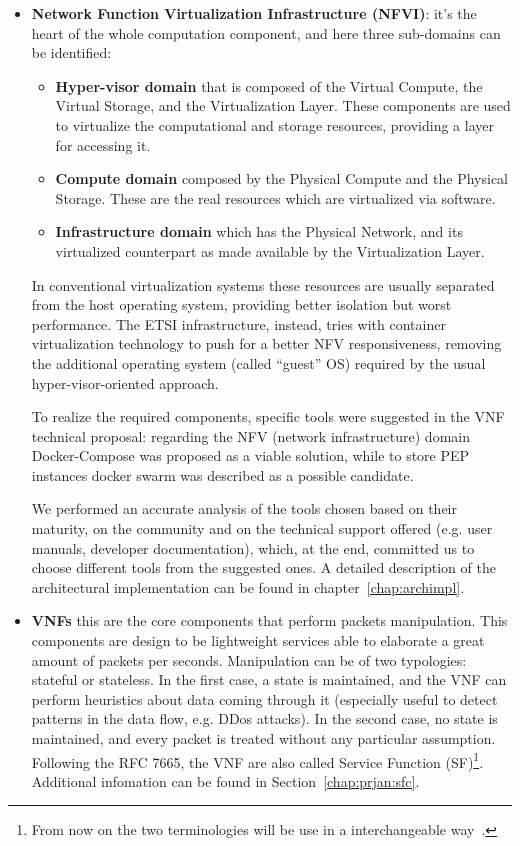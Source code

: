 \begin{itemize}
 \item \textbf{Network Function Virtualization Infrastructure (NFVI)}: it's the
   heart of the whole computation component, and here three sub-domains can be
   identified: 
\begin{itemize} 
 \item \textbf{Hyper-visor domain} that is composed of the Virtual Compute, the
   Virtual Storage, and the Virtualization Layer. These components are used to
   virtualize the computational and storage resources, providing a layer for
   accessing it.
 \item \textbf{Compute domain} composed by the Physical Compute and the Physical
   Storage. These are the real resources which are virtualized via software.
 \item \textbf{Infrastructure domain} which has the Physical Network, and its
   virtualized counterpart as made available by the Virtualization Layer.
\end{itemize}

In conventional virtualization systems these resources are usually separated
from the host operating system, providing better isolation but worst
performance. The ETSI infrastructure, instead, tries with container
virtualization technology to push for a better NFV responsiveness, removing the
additional operating system (called ``guest'' OS) required by the usual
hyper-visor-oriented approach.

To realize the required components, specific tools were suggested in the VNF
technical proposal: regarding the NFV (network infrastructure) domain
Docker-Compose was proposed as a viable solution, while to store PEP instances
docker swarm was described as a possible candidate.

We performed an accurate analysis of the tools chosen based on their maturity,
on the community and on the technical support offered (e.g. user manuals,
developer documentation), which, at the end, committed us to choose different
tools from the suggested ones. A detailed description of the architectural
implementation can be found in chapter~\ref{chap:archimpl}.

\item \textbf{VNFs} this are the core components that perform packets
  manipulation. This components are design to be lightweight services able to
  elaborate a great amount of packets per seconds. Manipulation can be of two
  typologies: stateful or stateless. In the first case, a state is maintained,
  and the VNF can perform heuristics about data coming through it (especially
  useful to detect patterns in the data flow, e.g. DDos attacks). In the second
  case, no state is maintained, and every packet is treated without any
  particular assumption. Following the RFC 7665, the VNF are also called Service
  Function (SF)\footnote{From now on the two terminologies will be use in a
    interchangeable way~\cite{medhat2017service}.}. Additional infomation can be
  found in Section~\ref{chap:prjan:sfc}.


\end{itemize}

